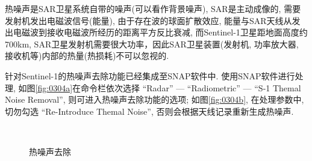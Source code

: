 热噪声是SAR卫星系统自带的噪声(可以看作背景噪声), SAR是主动成像的, 需要发射机发出电磁波信号(能量), 由于存在波的球面扩散效应, 能量与SAR天线从发出电磁波到接收电磁波所经历的距离平方反比衰减, 而Sentinel-1卫星距地面高度约700km, SAR卫星发射机需要很大功率，因此SAR卫星装置(发射机, 功率放大器, 接收机等)内部的热量(热损耗)不可以忽视的.

针对Sentinel-1的热噪声去除功能已经集成至SNAP软件中. 使用SNAP软件进行处理, 如图\ref{fig:0304a}在命令栏依次选择 ``Radar'' --- ``Radiometric'' --- ``S-1 Themal Noise Removal'', 则可进入热噪声去除功能的选项; 如图\ref{fig:0304b}, 在处理参数中, 切勿勾选 ``Re-Introduce Themal Noise'', 否则会根据天线记录重新生成热噪声. 

\begin{figure}[h]
    \centering
    \qquad
    \\[12pt]
    \caption{热噪声去除}
    \label{fig:0304}
\end{figure}

